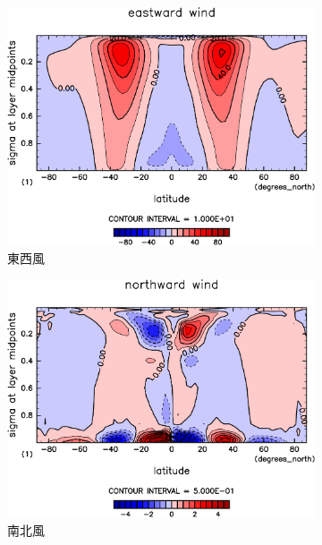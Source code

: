 \documentclass[body]{subfiles}
\begin{document}
\begin{figure}[t]
	\centering
	\begin{subfigure}{.4\textwidth}
		\centering
		\includegraphics[width=\columnwidth]{S1366/U,time=14600:14965-crop-rotate.pdf}
		\caption{東西風}
	\end{subfigure}
	\begin{subfigure}{.4\textwidth}
		\centering
		\includegraphics[width=\columnwidth]{S1366/V,time=14600:14965-crop-rotate.pdf}
		\caption{南北風}
	\end{subfigure}
	\begin{subfigure}{.4\textwidth}
		\centering

\end{subfigure}
\end{figure}
\end{document}
